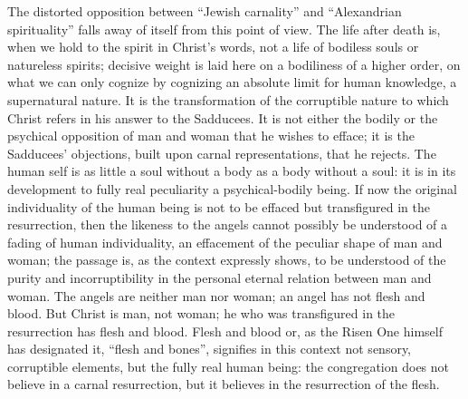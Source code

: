 \documentclass[12pt,a4paper,openany]{book}
\newcommand{\opage}[1]{\marginnote{\footnotesize\textit{[#1]}}}
\begin{document}
The distorted opposition between ``Jewish carnality''
and ``Alexandrian spirituality'' falls away of itself from this
point of view.  The life after death is, when
we hold to the spirit in Christ's words, not a life of bodiless
souls or natureless spirits; decisive weight is laid here
on a bodiliness of a higher order, on what we
can only cognize by cognizing an absolute limit
for human knowledge, a supernatural nature.  It
is the transformation of the corruptible nature to which Christ
refers in his answer to the Sadducees.  It is not
either the bodily or the psychical opposition
of man and woman that he wishes to efface; it is the Sadducees'
objections, built upon carnal representations, that
he rejects.  The human self is as little a
soul without a body as a body without a soul: it is in
its development to fully real peculiarity a psychical-bodily
being.  If now the original individuality of the human being
is not to be effaced but transfigured in the resurrection,
then the likeness to the angels cannot possibly be
\setcounter{footnote}{0}%
\opage{222}understood of a fading of human individuality,
an effacement of the peculiar shape of man and woman; the passage
is, as the context expressly shows, to be understood of the purity and incorruptibility
in the personal eternal relation between man
and woman.  The angels are neither man nor woman;
an angel has not flesh and blood.  But Christ is man,
not woman; he who was transfigured in the resurrection has flesh
and blood.  Flesh and blood or, as the Risen One himself
has designated it, ``flesh and bones'', signifies in this context
not sensory, corruptible elements, but
the fully real human being: the congregation does not believe
in a carnal resurrection, but it believes in the resurrection
of the flesh.
\end{document}

